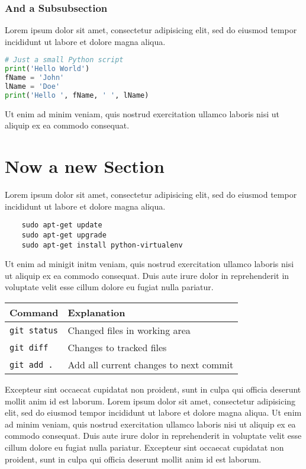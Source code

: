 \documentclass{modernCS}
\begin{document}
\subsubsection{And a Subsubsection}
Lorem ipsum dolor sit amet, consectetur adipisicing elit, sed do eiusmod
tempor incididunt ut labore et dolore magna aliqua.
\begin{lstlisting}[language=Python]
# Just a small Python script
print('Hello World')
fName = 'John'
lName = 'Doe'
print('Hello ', fName, ' ', lName)
\end{lstlisting}
Ut enim ad minim veniam,
quis nostrud exercitation ullamco laboris nisi ut aliquip ex ea commodo
consequat.

\section{Now a new Section}
Lorem ipsum dolor sit amet, consectetur adipisicing elit, sed do eiusmod
tempor incididunt ut labore et dolore magna aliqua.
\begin{lstlisting}
	sudo apt-get update
	sudo apt-get upgrade
	sudo apt-get install python-virtualenv
\end{lstlisting}
Ut enim ad minigit initm veniam,
quis nostrud exercitation ullamco laboris nisi ut aliquip ex ea commodo
consequat. Duis aute irure dolor in reprehenderit in voluptate velit esse
cillum dolore eu fugiat nulla pariatur.
\begin{center}
\begin{tabular}{ll}
\toprule
Command & Explanation \\
\midrule
\verb+git status+ & Changed files in working area \\
\verb+git diff+ & Changes to tracked files \\
\verb+git add .+ & Add all current changes to next commit \\
\bottomrule
\end{tabular}
\end{center}
Excepteur sint occaecat cupidatat non
proident, sunt in culpa qui officia deserunt mollit anim id est laborum.
Lorem ipsum dolor sit amet, consectetur adipisicing elit, sed do eiusmod
tempor incididunt ut labore et dolore magna aliqua. Ut enim ad minim veniam,
quis nostrud exercitation ullamco laboris nisi ut aliquip ex ea commodo
consequat. Duis aute irure dolor in reprehenderit in voluptate velit esse
cillum dolore eu fugiat nulla pariatur. Excepteur sint occaecat cupidatat non
proident, sunt in culpa qui officia deserunt mollit anim id est laborum.
\end{document}

